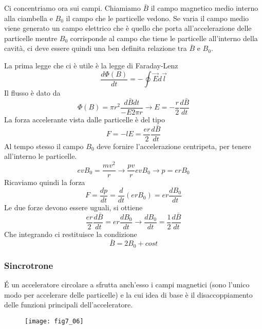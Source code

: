 Ci concentriamo ora sui campi.
Chiamiamo $\bar{B}$ il campo magnetico medio interno alla ciambella e $B_0$ il campo che le particelle vedono.
Se varia il campo medio viene generato un campo elettrico che è quello che porta all'accelerazione delle particelle mentre $B_0$ corrisponde al campo che tiene le particelle all'interno della cavità, ci deve essere quindi una ben definita relazione tra $\bar{B}$ e $B_0$.

La prima legge che ci è utile è la legge di Faraday-Lenz
\begin{equation}
\frac{d\Phi (B)}{dt}=-\oint \vec{E} d\vec{l}
\end{equation}
Il flusso è dato da
\begin{equation}
\Phi(B) =\pi r^2\frac{d\bar{B}dt}{-E2\pi r}\to E=-\frac{r}{2}\frac{d\bar{B}}{dt}
\end{equation}
La forza accelerante vista dalle particelle è del tipo 
\begin{equation}
F=-lE=\frac{er}{2}\frac{d\bar{B}}{dt}
\end{equation}
Al tempo stesso il campo $B_0$ deve fornire l'accelerazione centripeta, per tenere all'interno le particelle.
\begin{equation}
evB_0=\frac{mv^2}{r}\to \frac{pv}{r}evB_0\to p=erB_0
\end{equation}
Ricaviamo quindi la forza
\begin{equation}
F=\frac{dp}{dt}=\frac{d}{dt}(erB_0)=er\frac{dB_0}{dt}
\end{equation}
Le due forze devono essere uguali, si ottiene
\begin{equation}
\frac{er}{2}\frac{d\bar{B}}{dt}=er\frac{dB_0}{dt}\to \frac{dB_0}{dt}=\frac{1}{2}\frac{d\bar{B}}{dt}
\end{equation}
Che integrando ci restituisce la condizione
\begin{equation}
\bar{B}=2B_0+cost
\end{equation}

\subsubsection{Sincrotrone}
\'E un acceleratore circolare a sfrutta anch'esso i campi magnetici (sono l'unico modo per accelerare delle particelle) e la cui idea di base è il disaccoppiamento delle funzioni principali dell'acceleratore.
\begin{figure}[h]
\centering
\texttt{[image: fig7\_06]}
\end{figure}

